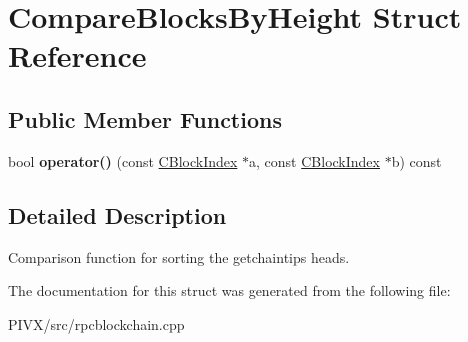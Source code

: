 \hypertarget{struct_compare_blocks_by_height}{}\section{Compare\+Blocks\+By\+Height Struct Reference}
\label{struct_compare_blocks_by_height}
\subsection*{Public Member Functions}
\begin{DoxyCompactItemize}
\item 
\mbox{\label{struct_compare_blocks_by_height_a613b9fc9c04de22e8e521f908c932454}} 
bool {\bfseries operator()} (const \mbox{\hyperlink{class_c_block_index}{C\+Block\+Index}} $\ast$a, const \mbox{\hyperlink{class_c_block_index}{C\+Block\+Index}} $\ast$b) const
\end{DoxyCompactItemize}


\subsection{Detailed Description}
Comparison function for sorting the getchaintips heads. 

The documentation for this struct was generated from the following file\+:\begin{DoxyCompactItemize}
\item 
P\+I\+V\+X/src/rpcblockchain.\+cpp\end{DoxyCompactItemize}
